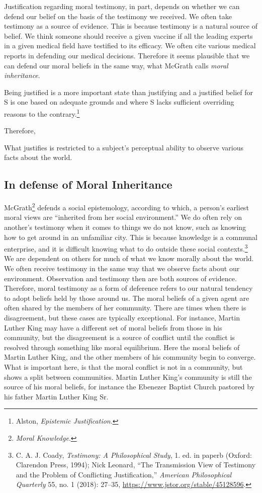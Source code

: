 \documentclass[phdthesis,12pt,final]{wuthesis}
\theoremstyle{definition}
\theoremstyle{definition}
\theoremstyle{definition}
\theoremstyle{definition}
\theoremstyle{remark}
\begin{document}
Justification regarding moral testimony, in part, depends on whether we can defend our belief on the basis of the testimony we received. We often take testimony as a source of evidence. This is because testimony is a natural source of belief. We think someone should receive a given vaccine if all the leading experts in a given medical field have testified to its efficacy. We often cite various medical reports in defending our medical decisions. Therefore it seems plausible that we can defend our moral beliefs in the same way, what McGrath calls \emph{moral inheritance}.

Being justified is a more important state than justifying and a justified belief for S is one based on adequate grounds and where S lacks sufficient overriding reasons to the contrary.\footnote{Alston, \emph{Epistemic Justification}.}

Therefore,

What justifies is restricted to a subject's perceptual ability to observe various facts about the world.

\subsection*{In defense of Moral Inheritance}\label{in-defense-of-moral-inheritance}

McGrath\footnote{\emph{Moral {Knowledge}}.} defends a social epistemology, according to which, a person's earliest moral views are ``inherited from her social environment.'' We do often rely on another's testimony when it comes to things we do not know, such as knowing how to get around in an unfamiliar city. This is because knowledge is a communal enterprise, and it is difficult knowing what to do outside these social contexts.\footnote{C. A. J. Coady, \emph{Testimony: A Philosophical Study}, 1. ed. in paperb (Oxford: Clarendon Press, 1994); Nick Leonard, {``The {Transmission View} of {Testimony} and the {Problem} of {Conflicting Justification},''} \emph{American Philosophical Quarterly} 55, no. 1 (2018): 27--35, \url{https://www.jstor.org/stable/45128596}.} We are dependent on others for much of what we know morally about the world. We often receive testimony in the same way that we observe facts about our environment. Observation and testimony then are both sources of evidence. Therefore, moral testimony as a form of deference refers to our natural tendency to adopt beliefs held by those around us. The moral beliefs of a given agent are often shared by the members of her community. There are times when there is disagreement, but these cases are typically exceptional. For instance, Martin Luther King may have a different set of moral beliefs from those in his community, but the disagreement is a source of conflict until the conflict is resolved through something like moral equilibrium. Here the moral beliefs of Martin Luther King, and the other members of his community begin to converge. What is important here, is that the moral conflict is not in a community, but shows a split between communities. Martin Luther King's community is still the source of his moral beliefs, for instance the Ebenezer Baptist Church pastored by his father Martin Luther King Sr.
\end{document}
